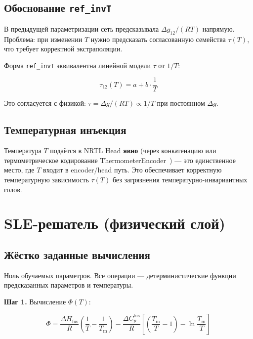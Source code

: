 \documentclass[11pt]{article}
\begin{document}
\subsection{Обоснование \texttt{ref\_invT}}

В предыдущей параметризации сеть предсказывала $\Delta g_{12}/(RT)$ напрямую. Проблема: при изменении $T$ нужно предсказать согласованную семейства $\tau(T)$, что требует корректной экстраполяции.

Форма \texttt{ref\_invT} эквивалентна линейной модели $\tau$ от $1/T$:

\begin{equation*}
\tau_{12}(T) = a + b \cdot \frac{1}{T}
\end{equation*}

Это согласуется с физикой: $\tau = \Delta g/(RT) \propto 1/T$ при постоянном $\Delta g$.

\subsection{Температурная инъекция}

Температура $T$ подаётся в NRTL Head \textbf{явно} (через конкатенацию или термометрическое кодирование ThermometerEncoder~\cite{buckman2018}) --- это единственное место, где $T$ входит в encoder/head путь. Это обеспечивает корректную температурную зависимость $\tau(T)$ без загрязнения температурно-инвариантных голов.

\section{SLE-решатель (физический слой)}

\subsection{Жёстко заданные вычисления}

Ноль обучаемых параметров. Все операции --- детерминистические функции предсказанных параметров и температуры.

\textbf{Шаг 1.} Вычисление $\Phi(T)$:

\begin{equation*}
\Phi = \frac{\Delta H_{\mathrm{fus}}}{R}\!\left(\frac{1}{T} - \frac{1}{T_{\mathrm{m}}}\right) - \frac{\Delta C_p^{\mathrm{fus}}}{R}\!\left[\left(\frac{T_{\mathrm{m}}}{T} - 1\right) - \ln\frac{T_{\mathrm{m}}}{T}\right]
\end{equation*}
\end{document}
